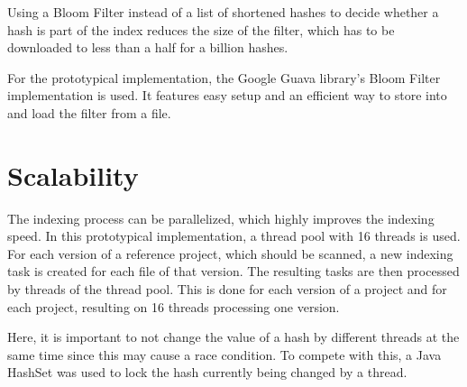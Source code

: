 Using a Bloom Filter instead of a list of shortened hashes to decide whether a hash is part of the index reduces the size of the filter, which has to be downloaded to less than a half for a billion hashes.

For the prototypical implementation, the Google Guava library's Bloom Filter implementation is used.
It features easy setup and an efficient way to store into and load the filter from a file.

\section{Scalability}\label{section:implementation/scalability}
The indexing process can be parallelized, which highly improves the indexing speed.
In this prototypical implementation, a thread pool with 16 threads is used.
For each version of a reference project, which should be scanned, a new indexing task is created for each file of that version.
The resulting tasks are then processed by threads of the thread pool.
This is done for each version of a project and for each project, resulting on 16 threads processing one version.

Here, it is important to not change the value of a hash by different threads at the same time since this may cause a race condition.
To compete with this, a Java HashSet was used to lock the hash currently being changed by a thread.

